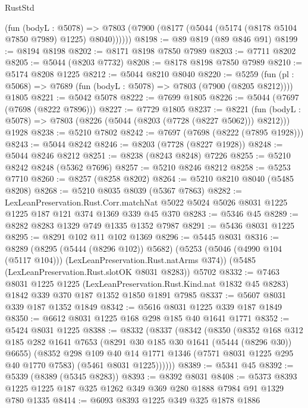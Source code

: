 \begin{lexlean}{RustStd}
\begin{coremodule}
        (fun (bodyL : @5078) =>
        @7803 (@7900 (@8177 (@5044 (@5174 (@8178 @5104 @7850 @7989) @1225) @8040))))))
@8198 := @89 @819 (@89 @846 @91)
@8199 := @8194 @8198
@8202 := @8171 @8198 @7850 @7989
@8203 := @7711 @8202
@8205 := @5044 (@8203 @7732)
@8208 := @8178 @8198 @7850 @7989
@8210 := @5174 @8208 @1225
@8212 := @5044 @8210 @8040
@8220 := @5259
    (fun (pl : @5068) => @7689 (fun (bodyL : @5078) => @7803 (@7900 (@8205 @8212))))
    @1805
@8221 := @5042 @5078
@8222 := @7699 @1805
@8226 := @5044 (@7697 (@7698 (@8222 @7896)))
@8227 := @7729 @1805
@8237 := @8221
    (fun (bodyL : @5078) => @7803 (@8226 (@5044 (@8203 (@7728 (@8227 @5062))) @8212)))
    @1928
@8238 := @5210 @7802
@8242 := @7697 (@7698 (@8222 (@7895 @1928)))
@8243 := @5044 @8242
@8246 := @8203 (@7728 (@8227 @1928))
@8248 := @5044 @8246 @8212
@8251 := @8238 (@8243 @8248) @7226
@8255 := @5210 @8242 @8248 (@5362 @7696)
@8257 := @5210 @8246 @8212
@8258 := @5253 @7710
@8260 := @8257 (@8258 @8202)
@8264 := @5210 @8210 @8040 (@5485 @8208)
@8268 := @5210 @8035 @8039 (@5367 @7863)
@8282 := LexLeanPreservation.Rust.Corr.matchNat
    @5022
    @5024
    @5026
    @8031
    @1225
    @1225
    @187
    @121
    @374
    @1369
    @339
    @45
    @370
@8283 := @5346 @45
@8289 := @8282 @8283 @1329 @749 @1335 @1352 @7987
@8291 := @5436 @8031 @1225
@8295 := @8291 @102 @11 @102 @1369
@8296 := @5445 @8031
@8316 := @8289
    (@8295 (@5444 (@8296 @102)) @5682)
    (@5253 (@5046 (@4990 @104 (@5117 @104))) (LexLeanPreservation.Rust.natArms @374))
    (@5485 (LexLeanPreservation.Rust.slotOK @8031 @8283))
    @5702
@8332 := @7463
    @8031
    @1225
    @1225
    (LexLeanPreservation.Rust.Kind.nat @1832 @45 @8283)
    @1842
    @339
    @370
    @187
    @1352
    @1850
    @1891
    @7985
@8337 := @5607 @8031 @339 @187 @1352 @1849
@8342 := @5616 @8031 @1225 @339 @187 @1849
@8350 := @6612 @8031 @1225 @168 @298 @185 @40 @1641 @1771
@8352 := @5424 @8031 @1225
@8388 := @8332
    (@8337
      (@8342
        (@8350
          (@8352
            @168
            @312
            @185
            @282
            @1641
            @7653
            (@8291 @30 @185 @30 @1641 (@5444 (@8296 @30)) @6655)
            (@8352
              @298
              @109
              @40
              @14
              @1771
              @1346
              (@7571 @8031 @1225 @295 @40 @1770 @7583)
              (@5461 @8031 @1225))))))
@8389 := @5341 @45
@8392 := @5339 (@8389 (@5345 @8283))
@8393 := @8392 @8031
@8408 := @5373 @8393 @1225 @1225 @187 @325 @1262 @349 @369 @280 @1888 @7984 @91 @1329 @780 @1335
@8414 := @6093 @8393 @1225 @349 @325 @1878 @1886

\end{coremodule}
\end{lexlean}
